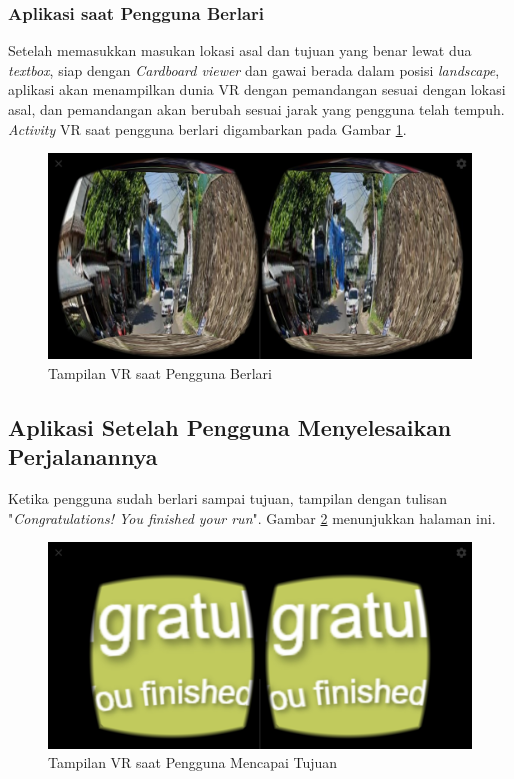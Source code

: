 \subsubsection{Aplikasi saat Pengguna Berlari}
Setelah memasukkan masukan lokasi asal dan tujuan yang benar lewat dua \textit{textbox}, siap dengan \textit{Cardboard viewer} dan gawai berada dalam posisi \textit{landscape},  aplikasi akan menampilkan dunia VR dengan pemandangan sesuai dengan lokasi asal, dan pemandangan akan berubah sesuai jarak yang pengguna telah tempuh. \textit{Activity} VR saat pengguna berlari digambarkan pada Gambar \ref{fig:vr-page}.

\begin{figure}
\centering
\includegraphics[scale=0.3]{Gambar/vr-page.png}
    \caption{Tampilan VR saat Pengguna Berlari}
    \label{fig:vr-page}
\end{figure}

\subsection{Aplikasi Setelah Pengguna Menyelesaikan Perjalanannya}
Ketika pengguna sudah berlari sampai tujuan, tampilan dengan tulisan "\textit{Congratulations! You finished your run}". Gambar \ref{fig:finished-page} menunjukkan halaman ini.

\begin{figure}
\centering
\includegraphics[scale=0.15]{Gambar/finished-page.png}
    \caption{Tampilan VR saat Pengguna Mencapai Tujuan}
    \label{fig:finished-page}
\end{figure}


